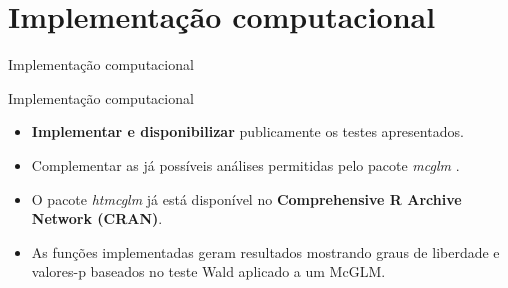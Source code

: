 \documentclass[
  ignorenonframetext,
  serif,
  professionalfont,
  usenames,
  dvipsnames,
  aspectratio = 169]{beamer}
\begin{document}
\hypertarget{implementauxe7uxe3o-computacional}{%
\section{Implementação
computacional}\label{implementauxe7uxe3o-computacional}}

\begin{frame}{Implementação computacional}
\end{frame}

\begin{frame}{Implementação computacional}
\protect\hypertarget{implementauxe7uxe3o-computacional-1}{}
\begin{itemize}
  \itemsep 2ex
  
  \item \textbf{Implementar e disponibilizar} publicamente os testes apresentados.

  \item Complementar as já possíveis análises permitidas pelo pacote \emph{mcglm} \citep{mcglm}.

  \item O pacote \emph{htmcglm} já está disponível no \textbf{Comprehensive R Archive Network (CRAN)}.

  \item As funções implementadas geram resultados mostrando graus de liberdade e valores-p baseados no teste Wald aplicado a um McGLM.
\end{itemize}
\end{frame}
\end{document}
